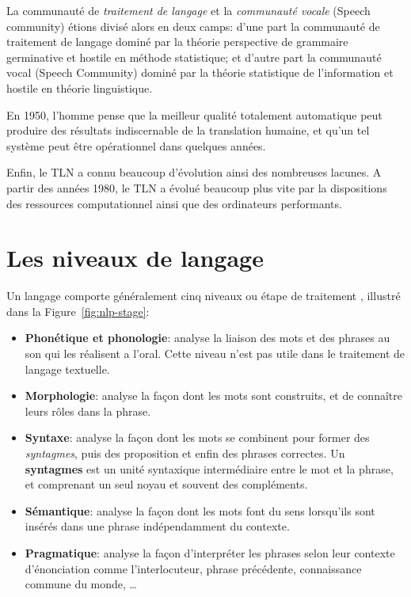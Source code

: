 La communauté de \emph{traitement de langage} et la \emph{communauté vocale} (Speech community) étions divisé alors en deux camps: d'une part la communauté de traitement de langage dominé par la théorie perspective de grammaire germinative et hostile en méthode statistique; et d'autre part la communauté vocal (Speech Community) dominé par la théorie statistique de l'information et hostile en théorie linguistique.

En 1950, l'homme pense que la meilleur qualité totalement automatique peut produire des résultats indiscernable de la translation humaine, et qu'un tel système peut être opérationnel dans quelques années.

Enfin, le TLN a connu beaucoup d'évolution ainsi des nombreuses lacunes. A partir des années 1980, le TLN a évolué beaucoup plus vite par la dispositions des ressources computationnel ainsi que des ordinateurs performants.

\section{Les niveaux de langage}
Un langage comporte généralement cinq niveaux ou étape de traitement \citep*{automatic-nlp, handbook-nlp}, illustré dans la Figure~\ref{fig:nlp-stage}:
\begin{itemize}
    \item \textbf{Phonétique et phonologie}: analyse la liaison des mots et des phrases au son qui les réalisent a l'oral. Cette niveau n'est pas utile dans le traitement de langage textuelle.
    \item \textbf{Morphologie}: analyse la façon dont les mots sont construits, et de connaître leurs rôles dans la phrase.
    \item \textbf{Syntaxe}: analyse la façon dont les mots se combinent pour former des \textit{syntagmes}, puis des proposition et enfin des phrases correctes. Un \textbf{syntagmes} est un unité syntaxique intermédiaire entre le mot et la phrase, et comprenant un seul noyau et souvent des compléments.
    \item \textbf{Sémantique}: analyse la façon dont les mots font du sens lorsqu'ils sont insérés dans une phrase indépendamment du contexte.
    \item \textbf{Pragmatique}: analyse la façon d’interpréter les phrases selon leur contexte d'énonciation comme l'interlocuteur, phrase précédente, connaissance commune du monde, \dots
\end{itemize}

